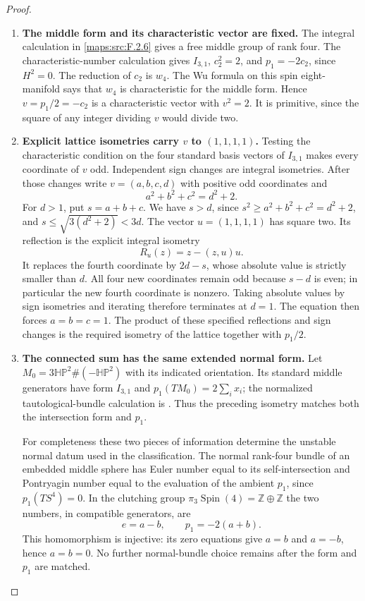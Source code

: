 \documentclass[11pt,a4paper]{article}
\theoremstyle{definition}
\begin{document}
\begin{proof}
\begin{enumerate}[label=\arabic*.]
\item \textbf{The middle form and its characteristic vector are fixed.}
The integral calculation in \cref{maps:src:F.2.6} gives a free
middle group of rank four.  The characteristic-number calculation
gives $I_{3,1}$, $c_2^2=2$, and $p_1=-2c_2$, since $H^2=0$.
The reduction of $c_2$ is $w_4$.  The Wu formula on this spin
eight-manifold says that $w_4$ is characteristic for the middle
form.  Hence $v=p_1/2=-c_2$ is a characteristic vector with
$v^2=2$.  It is primitive, since the square of any integer
dividing $v$ would divide two.

\item \textbf{Explicit lattice isometries carry $v$ to
$(1,1,1,1)$.}
Testing the characteristic condition on the four standard basis
vectors of $I_{3,1}$ makes every coordinate of $v$ odd.
Independent sign changes are integral isometries.  After those
changes write $v=(a,b,c,d)$ with positive odd coordinates and
\[
a^2+b^2+c^2=d^2+2.
\]
For $d>1$, put $s=a+b+c$.  We have $s>d$, since
$s^2\geq a^2+b^2+c^2=d^2+2$, and
$s\leq\sqrt{3(d^2+2)}<3d$.  The vector
$u=(1,1,1,1)$ has square two.  Its reflection is the explicit
integral isometry
\[
R_u(z)=z-(z,u)u.
\]
It replaces the fourth coordinate by $2d-s$, whose absolute
value is strictly smaller than $d$.  All four new coordinates
remain odd because $s-d$ is even; in particular the new fourth
coordinate is nonzero.  Taking absolute values by sign
isometries and iterating therefore terminates at $d=1$.
The equation then forces $a=b=c=1$.  The product of these
specified reflections and sign changes is the required
isometry of the lattice together with $p_1/2$.

\item \textbf{The connected sum has the same extended normal form.}
Let $M_0=3\mathbb{HP}^2\#(-\mathbb{HP}^2)$ with its indicated
orientation.  Its standard middle generators have form $I_{3,1}$
and $p_1(TM_0)=2\sum_i x_i$; the normalized tautological-bundle
calculation is \cite[Lemma 2.1, p.~5, and Theorem 2.4, p.~7]{ffMandal}.
Thus the preceding isometry matches both the intersection form
and $p_1$.

For completeness these two pieces of information determine the
unstable normal datum used in the classification.  The normal
rank-four bundle of an embedded middle sphere has Euler number
equal to its self-intersection and Pontryagin number equal to
the evaluation of the ambient $p_1$, since $p_1(TS^4)=0$.
In the clutching group
$\pi_3\operatorname{Spin}(4)=\mathbb Z\oplus\mathbb Z$ the two
numbers, in compatible generators, are
\[
e=a-b,\qquad p_1=-2(a+b).
\]
This homomorphism is injective: its zero equations give
$a=b$ and $a=-b$, hence $a=b=0$.  No further normal-bundle
choice remains after the form and $p_1$ are matched.


\end{enumerate}
\end{proof}
\end{document}
